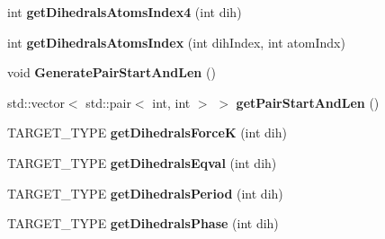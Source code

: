 \begin{DoxyCompactItemize}
\item 
int {\bfseries get\+Dihedrals\+Atoms\+Index4} (int dih)\hypertarget{classreadAmberInput_a0cc3bb8223f08dce1d0d0114c073ab80}{}\label{classreadAmberInput_a0cc3bb8223f08dce1d0d0114c073ab80}

\item 
int {\bfseries get\+Dihedrals\+Atoms\+Index} (int dih\+Index, int atom\+Indx)\hypertarget{classreadAmberInput_ad5e64bdc08945ea5b905c598d868997f}{}\label{classreadAmberInput_ad5e64bdc08945ea5b905c598d868997f}

\item 
void {\bfseries Generate\+Pair\+Start\+And\+Len} ()\hypertarget{classreadAmberInput_a7abab590512380f6df301a34acffb753}{}\label{classreadAmberInput_a7abab590512380f6df301a34acffb753}

\item 
std\+::vector$<$ std\+::pair$<$ int, int $>$ $>$ {\bfseries get\+Pair\+Start\+And\+Len} ()\hypertarget{classreadAmberInput_a5fbf47808885d4027d8c392406f713fc}{}\label{classreadAmberInput_a5fbf47808885d4027d8c392406f713fc}

\item 
T\+A\+R\+G\+E\+T\+\_\+\+T\+Y\+PE {\bfseries get\+Dihedrals\+ForceK} (int dih)\hypertarget{classreadAmberInput_acde7f8a3ca269e2bdeb5152d0bfc6a5f}{}\label{classreadAmberInput_acde7f8a3ca269e2bdeb5152d0bfc6a5f}

\item 
T\+A\+R\+G\+E\+T\+\_\+\+T\+Y\+PE {\bfseries get\+Dihedrals\+Eqval} (int dih)\hypertarget{classreadAmberInput_a980ebfa7365aaee0abdeead9a71bc593}{}\label{classreadAmberInput_a980ebfa7365aaee0abdeead9a71bc593}

\item 
T\+A\+R\+G\+E\+T\+\_\+\+T\+Y\+PE {\bfseries get\+Dihedrals\+Period} (int dih)\hypertarget{classreadAmberInput_a36159576736b92635d48cbf3387c967a}{}\label{classreadAmberInput_a36159576736b92635d48cbf3387c967a}

\item 
T\+A\+R\+G\+E\+T\+\_\+\+T\+Y\+PE {\bfseries get\+Dihedrals\+Phase} (int dih)\hypertarget{classreadAmberInput_a8382ab0b090b4860363a1c9428de61ad}{}\label{classreadAmberInput_a8382ab0b090b4860363a1c9428de61ad}

\end{DoxyCompactItemize}

